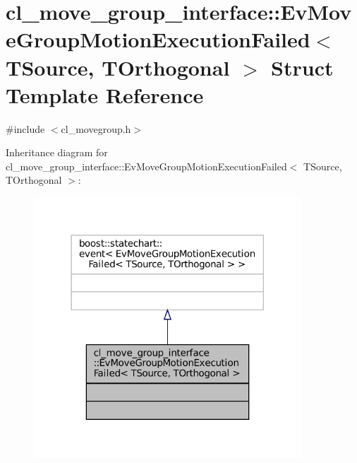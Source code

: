 \hypertarget{structcl__move__group__interface_1_1EvMoveGroupMotionExecutionFailed}{}\section{cl\+\_\+move\+\_\+group\+\_\+interface\+:\+:Ev\+Move\+Group\+Motion\+Execution\+Failed$<$ T\+Source, T\+Orthogonal $>$ Struct Template Reference}
\label{structcl__move__group__interface_1_1EvMoveGroupMotionExecutionFailed}


{\ttfamily \#include $<$cl\+\_\+movegroup.\+h$>$}



Inheritance diagram for cl\+\_\+move\+\_\+group\+\_\+interface\+:\+:Ev\+Move\+Group\+Motion\+Execution\+Failed$<$ T\+Source, T\+Orthogonal $>$\+:
\nopagebreak
\begin{figure}[H]
\begin{center}
\leavevmode
\includegraphics[width=284pt]{structcl__move__group__interface_1_1EvMoveGroupMotionExecutionFailed__inherit__graph}
\end{center}
\end{figure}


